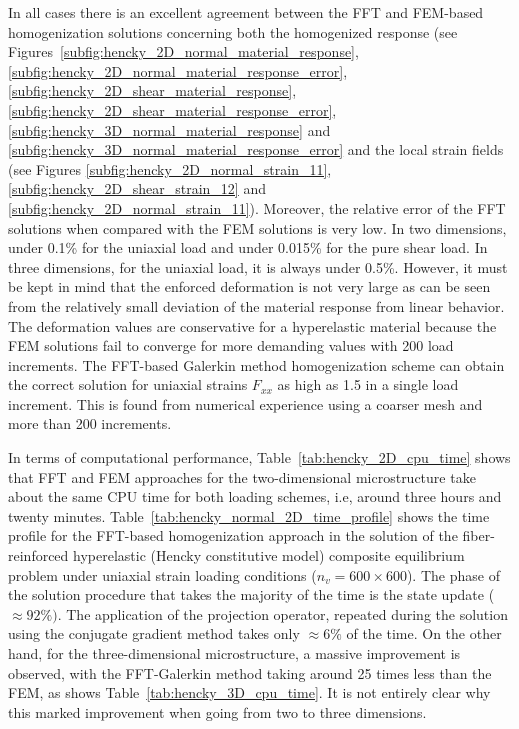 In all cases there is an excellent agreement between the FFT and FEM-based homogenization solutions concerning both the homogenized response (see Figures~\ref{subfig:hencky_2D_normal_material_response}, \ref{subfig:hencky_2D_normal_material_response_error}, \ref{subfig:hencky_2D_shear_material_response}, \ref{subfig:hencky_2D_shear_material_response_error}, \ref{subfig:hencky_3D_normal_material_response} and \ref{subfig:hencky_3D_normal_material_response_error} and the local strain fields (see Figures \ref{subfig:hencky_2D_normal_strain_11}, \ref{subfig:hencky_2D_shear_strain_12} and \ref{subfig:hencky_2D_normal_strain_11}).
Moreover, the relative error of the FFT solutions when compared with the FEM solutions is very low.
In two dimensions, under 0.1\% for the uniaxial load and under 0.015\% for the pure shear load.
In three dimensions, for the uniaxial load, it is always under 0.5\%.
However, it must be kept in mind that the enforced deformation is not very large as can be seen from the relatively small deviation of the material response from linear behavior.
The deformation values are conservative for a hyperelastic material because the FEM solutions fail to converge for more demanding values with 200 load increments.
The FFT-based Galerkin method homogenization scheme can obtain the correct solution for uniaxial strains \(F_{xx}\) as high as 1.5 in a single load increment.
This is found from numerical experience using a coarser mesh and more than 200 increments.

In terms of computational performance, Table~\ref{tab:hencky_2D_cpu_time} shows that FFT and FEM approaches for the two-dimensional microstructure take about the same CPU time for both loading schemes, i.e, around three hours and twenty minutes.
Table~\ref{tab:hencky_normal_2D_time_profile} shows the time profile for the FFT-based homogenization approach in the solution of the fiber-reinforced hyperelastic (Hencky constitutive model) composite equilibrium problem under uniaxial strain loading conditions (\(n_v=600\times 600\)).
The phase of the solution procedure that takes the majority of the time is the state update (\(\approx 92\%)\).
The application of the projection operator, repeated during the solution using the conjugate gradient method takes only \(\approx 6\%\) of the time.
On the other hand, for the three-dimensional microstructure, a massive improvement is observed, with the FFT-Galerkin method taking around 25 times less than the FEM, as shows Table~\ref{tab:hencky_3D_cpu_time}.
It is not entirely clear why this marked improvement when going from two to three dimensions.

